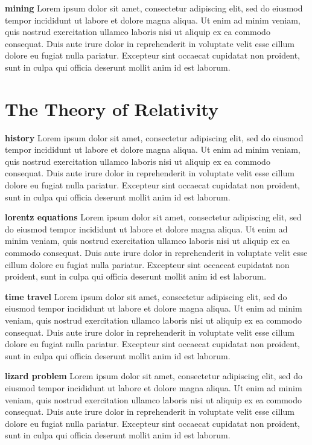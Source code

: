 \documentclass[conference]{IEEEtran}
\begin{document}
\textbf{mining} Lorem ipsum dolor sit amet, consectetur adipiscing elit, sed do eiusmod tempor incididunt ut labore et dolore magna aliqua. Ut enim ad minim veniam, quis nostrud exercitation ullamco laboris nisi ut aliquip ex ea commodo consequat. Duis aute irure dolor in reprehenderit in voluptate velit esse cillum dolore eu fugiat nulla pariatur. Excepteur sint occaecat cupidatat non proident, sunt in culpa qui officia deserunt mollit anim id est laborum.

\section{The Theory of Relativity}
\textbf{history} Lorem ipsum dolor sit amet, consectetur adipiscing elit, sed do eiusmod tempor incididunt ut labore et dolore magna aliqua. Ut enim ad minim veniam, quis nostrud exercitation ullamco laboris nisi ut aliquip ex ea commodo consequat. Duis aute irure dolor in reprehenderit in voluptate velit esse cillum dolore eu fugiat nulla pariatur. Excepteur sint occaecat cupidatat non proident, sunt in culpa qui officia deserunt mollit anim id est laborum.

\textbf{lorentz equations} Lorem ipsum dolor sit amet, consectetur adipiscing elit, sed do eiusmod tempor incididunt ut labore et dolore magna aliqua. Ut enim ad minim veniam, quis nostrud exercitation ullamco laboris nisi ut aliquip ex ea commodo consequat. Duis aute irure dolor in reprehenderit in voluptate velit esse cillum dolore eu fugiat nulla pariatur. Excepteur sint occaecat cupidatat non proident, sunt in culpa qui officia deserunt mollit anim id est laborum.

\textbf{time travel} Lorem ipsum dolor sit amet, consectetur adipiscing elit, sed do eiusmod tempor incididunt ut labore et dolore magna aliqua. Ut enim ad minim veniam, quis nostrud exercitation ullamco laboris nisi ut aliquip ex ea commodo consequat. Duis aute irure dolor in reprehenderit in voluptate velit esse cillum dolore eu fugiat nulla pariatur. Excepteur sint occaecat cupidatat non proident, sunt in culpa qui officia deserunt mollit anim id est laborum.

\textbf{lizard problem} Lorem ipsum dolor sit amet, consectetur adipiscing elit, sed do eiusmod tempor incididunt ut labore et dolore magna aliqua. Ut enim ad minim veniam, quis nostrud exercitation ullamco laboris nisi ut aliquip ex ea commodo consequat. Duis aute irure dolor in reprehenderit in voluptate velit esse cillum dolore eu fugiat nulla pariatur. Excepteur sint occaecat cupidatat non proident, sunt in culpa qui officia deserunt mollit anim id est laborum.
\end{document}
